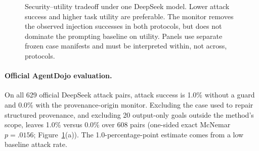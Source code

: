\documentclass[letterpaper,twocolumn,10pt]{article}
\theoremstyle{definition}
\begin{document}
\begin{figure}[t]
\caption{Security--utility tradeoff under one DeepSeek model. Lower attack
success and higher task utility are preferable. The monitor removes the
observed injection successes in both protocols, but does not dominate the
prompting baseline on utility. Panels use separate frozen case manifests and
must be interpreted within, not across, protocols.}
\label{fig:security-utility-tradeoff}
\end{figure}


\paragraph{Official AgentDojo evaluation.}
On all 629 official DeepSeek attack pairs, attack success is 1.0\% without a
guard and 0.0\% with the provenance-origin monitor.  Excluding the case used to repair
structured provenance, and excluding 20 output-only goals outside the method's
scope, leaves 1.0\% versus 0.0\% over 608 pairs (one-sided exact McNemar
$p=.0156$; Figure~\ref{fig:security-utility-tradeoff}(a)).  The 1.0-percentage-point estimate
comes from a low baseline attack rate.
\end{document}

